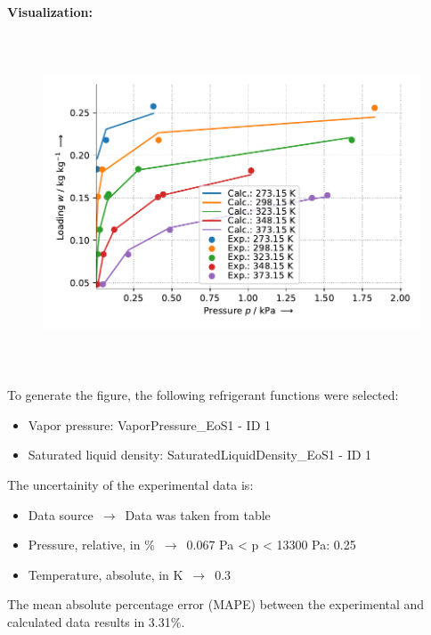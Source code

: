 \textbf{Visualization:}
%
\begin{figure}[!htp]
{\noindent\includegraphics[height=10cm, keepaspectratio]{figs/ads/ads_Water_zeolite_pellet_13X_Toth_1.pdf}}
\end{figure}
%

To generate the figure, the following refrigerant functions were selected:
\begin{itemize}
\item Vapor pressure: VaporPressure\_EoS1 - ID 1
\item Saturated liquid density: SaturatedLiquidDensity\_EoS1 - ID 1
\end{itemize}

The uncertainity of the experimental data is:
\begin{itemize}
\item Data source $\,\to\,$ Data was taken from table
\item Pressure, relative, in \% $\,\to\,$ 0.067 Pa < p < 13300 Pa: 0.25%
\item Temperature, absolute, in $\si{\kelvin}$ $\,\to\,$ 0.3
\end{itemize}

The mean absolute percentage error (MAPE) between the experimental and calculated data results in 3.31\%.
\FloatBarrier
\newpage
